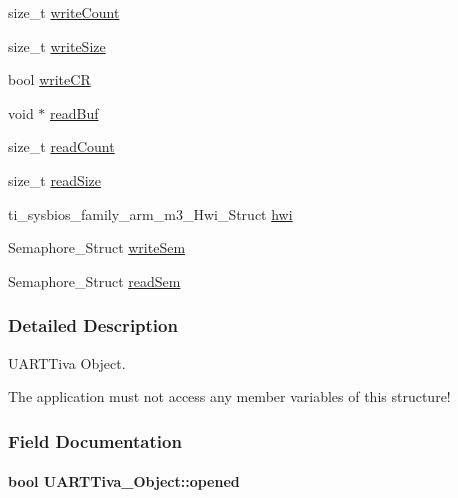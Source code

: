 \begin{DoxyCompactItemize}
\item 
size\-\_\-t \hyperlink{struct_u_a_r_t_tiva___object_ae198d2ae92793acf857c5f2767cf362e}{write\-Count}
\item 
size\-\_\-t \hyperlink{struct_u_a_r_t_tiva___object_adeca1fb4e60ad664300a0362700d33d7}{write\-Size}
\item 
bool \hyperlink{struct_u_a_r_t_tiva___object_a4e71550c4503ab77156e1afc75f7754d}{write\-C\-R}
\item 
void $\ast$ \hyperlink{struct_u_a_r_t_tiva___object_a9e4d6f255e30cc2cadf986113bac4153}{read\-Buf}
\item 
size\-\_\-t \hyperlink{struct_u_a_r_t_tiva___object_adcbed405b5985eb7a91d1e111df915b6}{read\-Count}
\item 
size\-\_\-t \hyperlink{struct_u_a_r_t_tiva___object_a9ff3cdeba70a612ccf0c90c1223759d6}{read\-Size}
\item 
ti\-\_\-sysbios\-\_\-family\-\_\-arm\-\_\-m3\-\_\-\-Hwi\-\_\-\-Struct \hyperlink{struct_u_a_r_t_tiva___object_aea348826397b66af9bac958c67a96def}{hwi}
\item 
Semaphore\-\_\-\-Struct \hyperlink{struct_u_a_r_t_tiva___object_abae42cf8deae05251566657fef910814}{write\-Sem}
\item 
Semaphore\-\_\-\-Struct \hyperlink{struct_u_a_r_t_tiva___object_a395f3b54f4968fd8d3dcb1aa0e33bde4}{read\-Sem}
\end{DoxyCompactItemize}


\subsubsection{Detailed Description}
U\-A\-R\-T\-Tiva Object. 

The application must not access any member variables of this structure! 

\subsubsection{Field Documentation}
\paragraph[{opened}]{\setlength{\rightskip}{0pt plus 5cm}bool U\-A\-R\-T\-Tiva\-\_\-\-Object\-::opened}\label{struct_u_a_r_t_tiva___object_a1c1768b81cb2710f9c7aed93badf5a80}
